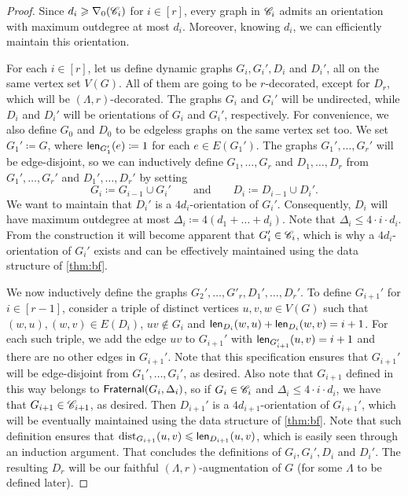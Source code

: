 \begin{proof} %
	Since $d_i \geqslant \nabla_0(\mathscr C_i)$ for $i \in [r]$, every graph in $\mathscr C_i$ admits an orientation with maximum outdegree at most $d_i$.
	Moreover, knowing $d_i$, we can efficiently maintain this orientation.
	
	For each $i\in [r]$,
	let us define dynamic graphs $G_i, G_i', D_i$ and $D_i'$, all on the same vertex set $V(G)$. All of them are going to be $r$-decorated, except for $D_r$, which will be $(\Lambda, r)$-decorated. The graphs $G_i$ and $G_i'$ will be undirected, while $D_i$ and $D_i'$ will be orientations of $G_i$ and $G_i'$, respectively. For convenience, we also define $G_0$ and $D_0$ to be edgeless graphs on the same vertex set too. We set $G_1' \coloneqq G$, where $\mathsf{len}_{G_1'}(e) \coloneqq 1$ for each $e \in E(G_1')$. The graphs $G_1', \ldots, G_r'$ will be edge-disjoint, so we can inductively define $G_1,\ldots,G_r$ and $D_1,\ldots,D_r$ from $G_1', \ldots, G_r'$ and $D_1', \ldots, D_r'$ by setting \[G_i \coloneqq G_{i-1} \cup G_i'\qquad\textrm{and}\qquad D_i \coloneqq D_{i-1} \cup D_i'.\] We want to maintain that $D_i'$ is a $4d_i$-orientation of $G_i'$. Consequently, $D_i$ will have maximum outdegree at most $\Delta_i \coloneqq 4(d_1+\ldots+d_i)$. Note that $\Delta_i \le 4 \cdot i \cdot d_i$. From the construction it will become apparent that $G_i' \in \mathscr C_i$, which is why a $4d_i$-orientation of $G_i'$ exists and can be effectively maintained using the data structure of \cref{thm:bf}.
	
	We now inductively define the graphs
	$G_2',\ldots,G'_r,D_1',\ldots,D_r'$.
	To define $G_{i+1}'$ for $i\in [r-1]$, consider a triple of distinct
	vertices $u, v, w \in V(G)$ such that
	$(w, u), (w, v) \in E(D_i)$, $uv \not\in G_i$ and
	$\mathsf{len}_{D_i}(w, u) + \mathsf{len}_{D_i}(w, v) =i+1$. For each such triple,
	we add the edge $uv$ to $G_{i+1}'$ with $\mathsf{len}_{G_{i+1}'}(u,v)=i+1$ and there are no other edges in $G_{i+1}'$. Note that this specification ensures that $G_{i+1}'$ will be edge-disjoint from $G_1', \ldots, G_i'$, as desired. Also note that $G_{i+1}$ defined in this way belongs to $\mathsf{Fraternal}(G_i, \Delta_i)$, so if $G_i \in \mathscr C_i$ and $\Delta_i \le 4 \cdot i \cdot d_i$, we have that $G_{i+1} \in \mathscr C_{i+1}$, as desired. Then $D_{i+1}'$ is a $4d_{i+1}$-orientation of $G_{i+1}'$, which will be eventually maintained using the data structure of \cref{thm:bf}. %
	Note that such definition ensures that $\mathrm{dist}_{G_{i+1}}(u,v)\leqslant \mathsf{len}_{D_{i+1}}(u,v)$, which is easily seen through an induction argument. That concludes the definitions of $G_i, G_i', D_i$ and $D_i'$. The resulting $D_r$ will be our faithful $(\Lambda, r)$-augmentation of $G$ (for some $\Lambda$ to be defined later).
	

\end{proof}
